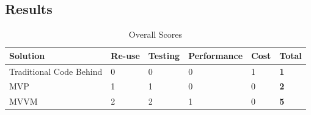 \documentclass[ece]{uw-wkrpt}
\begin{document}
\subsection{Results}
\begin{table}
\begin{center}
    \begin{tabular}{ | l | l | l | l | l | l |}
    \hline
    Solution & Re-use &Testing & Performance & Cost & Total  \\ \hline
    Traditional Code Behind & 0 & 0 & 0 & 1 &  \textbf 1  \\ \hline
    MVP & 1 & 1 & 0 & 0 &  \textbf 2  \\ \hline
    MVVM & 2 & 2 & 1 & 0 &  \textbf 5  \\ \hline
    \hline
    \end{tabular}
\end{center}
\caption{ Overall Scores}
	\label{table:overall}
\end{table}
\end{document}
